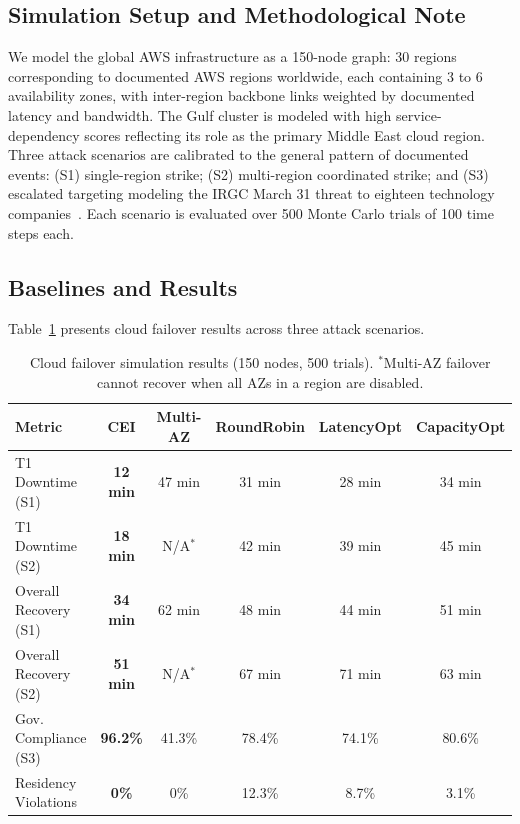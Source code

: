 \documentclass[runningheads]{llncs}
\begin{document}
\subsection{Simulation Setup and Methodological Note}

We model the global AWS infrastructure as a 150-node graph: 30 regions corresponding to documented AWS regions worldwide, each containing 3 to 6 availability zones, with inter-region backbone links weighted by documented latency and bandwidth. The Gulf cluster is modeled with high service-dependency scores reflecting its role as the primary Middle East cloud region. Three attack scenarios are calibrated to the general pattern of documented events: (S1) single-region strike; (S2) multi-region coordinated strike; and (S3) escalated targeting modeling the IRGC March 31 threat to eighteen technology companies~\cite{conversation}. Each scenario is evaluated over 500 Monte Carlo trials of 100 time steps each.

\subsection{Baselines and Results}

Table~\ref{tab:cloud} presents cloud failover results across three attack scenarios.

\begin{table}[ht]
\caption{Cloud failover simulation results (150 nodes, 500 trials). $^*$Multi-AZ failover cannot recover when all AZs in a region are disabled.}
\label{tab:cloud}
\centering
\small
\begin{tabular}{lccccc}
\toprule
Metric & \textbf{CEI} & Multi-AZ & RoundRobin & LatencyOpt & CapacityOpt \\
\midrule
T1 Downtime (S1) & \textbf{12 min} & 47 min & 31 min & 28 min & 34 min \\
T1 Downtime (S2) & \textbf{18 min} & N/A$^*$ & 42 min & 39 min & 45 min \\
Overall Recovery (S1) & \textbf{34 min} & 62 min & 48 min & 44 min & 51 min \\
Overall Recovery (S2) & \textbf{51 min} & N/A$^*$ & 67 min & 71 min & 63 min \\
Gov. Compliance (S3) & \textbf{96.2\%} & 41.3\% & 78.4\% & 74.1\% & 80.6\% \\
Residency Violations & \textbf{0\%} & 0\% & 12.3\% & 8.7\% & 3.1\% \\
\bottomrule
\end{tabular}
\end{table}
\end{document}
